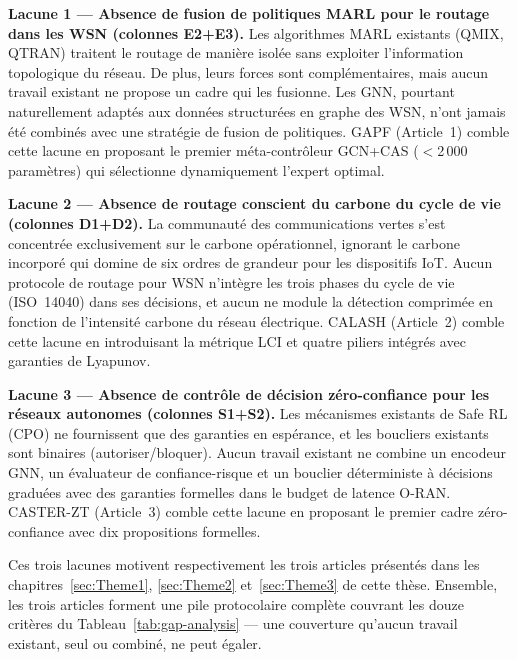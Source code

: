 \textbf{Lacune 1 --- Absence de fusion de politiques MARL pour le routage dans les WSN (colonnes E2+E3).} Les algorithmes MARL existants (QMIX, QTRAN) traitent le routage de manière isolée sans exploiter l'information topologique du réseau. De plus, leurs forces sont complémentaires, mais aucun travail existant ne propose un cadre qui les fusionne. Les GNN, pourtant naturellement adaptés aux données structurées en graphe des WSN, n'ont jamais été combinés avec une stratégie de fusion de politiques. GAPF (Article~1) comble cette lacune en proposant le premier méta-contrôleur GCN+CAS ($<$2\,000 paramètres) qui sélectionne dynamiquement l'expert optimal.

\textbf{Lacune 2 --- Absence de routage conscient du carbone du cycle de vie (colonnes D1+D2).} La communauté des communications vertes s'est concentrée exclusivement sur le carbone opérationnel, ignorant le carbone incorporé qui domine de six ordres de grandeur pour les dispositifs IoT. Aucun protocole de routage pour WSN n'intègre les trois phases du cycle de vie (ISO~14040) dans ses décisions, et aucun ne module la détection comprimée en fonction de l'intensité carbone du réseau électrique. CALASH (Article~2) comble cette lacune en introduisant la métrique LCI et quatre piliers intégrés avec garanties de Lyapunov.

\textbf{Lacune 3 --- Absence de contrôle de décision zéro-confiance pour les réseaux autonomes (colonnes S1+S2).} Les mécanismes existants de Safe RL (CPO) ne fournissent que des garanties en espérance, et les boucliers existants sont binaires (autoriser/bloquer). Aucun travail existant ne combine un encodeur GNN, un évaluateur de confiance-risque et un bouclier déterministe à décisions graduées avec des garanties formelles dans le budget de latence O-RAN. CASTER-ZT (Article~3) comble cette lacune en proposant le premier cadre zéro-confiance avec dix propositions formelles.

\medskip
Ces trois lacunes motivent respectivement les trois articles présentés dans les chapitres~\ref{sec:Theme1}, \ref{sec:Theme2} et~\ref{sec:Theme3} de cette thèse. Ensemble, les trois articles forment une pile protocolaire complète couvrant les douze critères du Tableau~\ref{tab:gap-analysis} --- une couverture qu'aucun travail existant, seul ou combiné, ne peut égaler.
